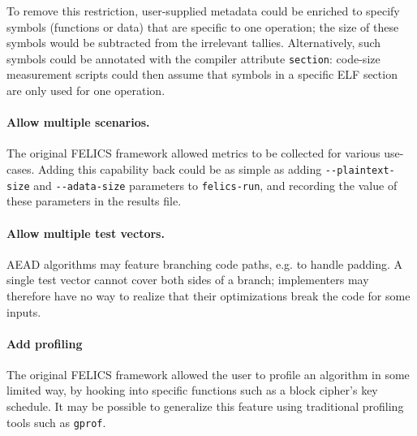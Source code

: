 \documentclass{article}
\begin{document}
To remove this restriction, user-supplied metadata could be enriched
to specify symbols (functions or data) that are specific to one
operation; the size of these symbols would be subtracted from the
irrelevant tallies.  Alternatively, such symbols could be annotated
with the compiler attribute \texttt{section}: code-size measurement
scripts could then assume that symbols in a specific ELF section are
only used for one operation.

\paragraph{Allow multiple scenarios.}

The original FELICS framework allowed metrics to be collected for
various use-cases.  Adding this capability back could be as simple as
adding \texttt{-{}-plaintext-size} and \texttt{-{}-adata-size}
parameters to \texttt{felics-run}, and recording the value of these
parameters in the results file.

\paragraph{Allow multiple test vectors.}

AEAD algorithms may feature branching code paths, e.g. to handle
padding.  A single test vector cannot cover both sides of a branch;
implementers may therefore have no way to realize that their
optimizations break the code for some inputs.

\paragraph{Add profiling}

The original FELICS framework allowed the user to profile an algorithm
in some limited way, by hooking into specific functions such as a
block cipher's key schedule.  It may be possible to generalize this
feature using traditional profiling tools such as \texttt{gprof}.



\end{document}
